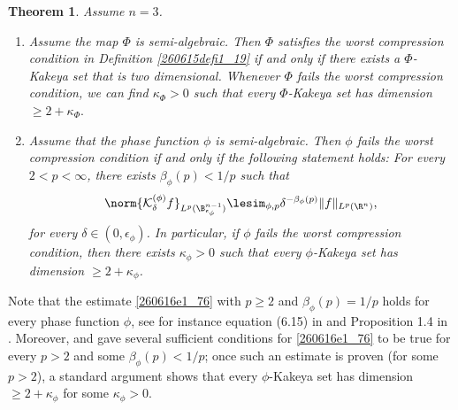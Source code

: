 \documentclass{article}
\numberwithin{equation}{section}
\theoremstyle{plain}
\newtheorem{theorem}{Theorem}[section]
\begin{document}
\begin{theorem}\label{260615theorem1_30}
Assume $n=3$.
\begin{enumerate}
\item Assume the map $\Phi$ is semi-algebraic. Then $\Phi$ satisfies the worst compression condition in Definition \ref{260615defi1_19} if and only if 
there exists a $\Phi$-Kakeya set that is two dimensional. Whenever $\Phi$ fails the worst compression condition, we can find $\kappa_{\Phi}>0$ such that every $\Phi$-Kakeya set has dimension $\ge 2+ \kappa_{\Phi}.$

\item Assume that the phase function $\phi$ is semi-algebraic. Then $\phi$ fails the worst compression condition if and only if the following statement holds: For every $2< p< \infty$, there exists $\beta_{\phi}(p)< 1/p$ such that 
\begin{equation}\label{260616e1_76}
\norm{
\mathcal{K}^{(\phi)}_{\delta} f
}_{L^p(
\B^{n-1}_{\epsilon_{\phi}}
)}
\lesim_{\phi, p}
\delta^{-\beta_{\phi}(p)} \|f\|_{L^p(\R^n)},
\end{equation}
for every $\delta\in (0, \epsilon_{\phi})$. In particular, if $\phi$ fails the worst compression condition, then there exists $\kappa_{\phi}>0$ such that every $\phi$-Kakeya set has dimension $\ge 2+ \kappa_{\phi}$.
\end{enumerate}
\end{theorem}




Note that the estimate \eqref{260616e1_76} with $p\ge 2$ and $\beta_{\phi}(p)=1/p$ holds for every phase function $\phi$, see for instance equation (6.15) in \cite{Bou91} and  Proposition 1.4 in \cite{CGGHIW24}. Moreover, \cite{Bou91} and  \cite{CGGHIW24} gave several sufficient conditions for \eqref{260616e1_76} to be true for every $p>2$ and some $\beta_{\phi}(p)< 1/p$; once such an estimate is proven (for some $p>2$), a standard argument shows that every $\phi$-Kakeya set has dimension $\ge 2+ \kappa_{\phi}$ for some $\kappa_{\phi}>0$. 
\end{document}
